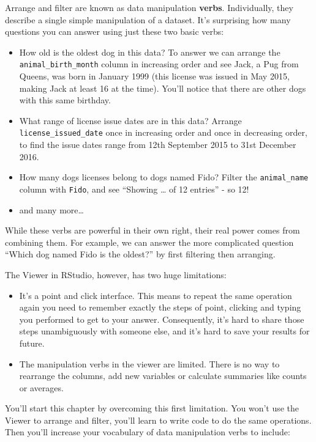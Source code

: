 \documentclass[]{Nemilov}
\begin{document}
Arrange and filter are known as data manipulation \textbf{verbs}. Individually, they describe a single simple manipulation of a dataset. It's surprising how many questions you can answer using just these two basic verbs:

\begin{itemize}
\item
  How old is the oldest dog in this data? To answer we can arrange the \texttt{animal\_birth\_month} column in increasing order and see Jack, a Pug from Queens, was born in January 1999 (this license was issued in May 2015, making Jack at least 16 at the time). You'll notice that there are other dogs with this same birthday.
\item
  What range of license issue dates are in this data? Arrange \texttt{license\_issued\_date} once in increasing order and once in decreasing order, to find the issue dates range from 12th September 2015 to 31st December 2016.
\item
  How many dogs licenses belong to dogs named Fido? Filter the \texttt{animal\_name} column with \texttt{Fido}, and see ``Showing \ldots{} of 12 entries'' - so 12!
\item
  and many more\ldots{}
\end{itemize}

While these verbs are powerful in their own right, their real power comes from combining them. For example, we can answer the more complicated question ``Which dog named Fido is the oldest?'' by first filtering then arranging.

The Viewer in RStudio, however, has two huge limitations:

\begin{itemize}
\item
  It's a point and click interface. This means to repeat the same operation again you need to remember exactly the steps of point, clicking and typing you performed to get to your answer. Consequently, it's hard to share those steps unambiguously with someone else, and it's hard to save your results for future.
\item
  The manipulation verbs in the viewer are limited. There is no way to rearrange the columns, add new variables or calculate summaries like counts or averages.
\end{itemize}

You'll start this chapter by overcoming this first limitation. You won't use the Viewer to arrange and filter, you'll learn to write code to do the same operations. Then you'll increase your vocabulary of data manipulation verbs to include:
\end{document}
